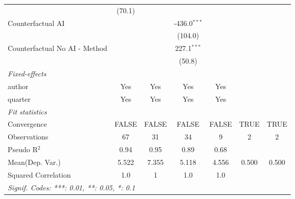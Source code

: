 \begin{tabular}{lcccccc}
                                                              & (70.1)       &                 &                &              &      &   \\   
   Counterfactual AI                                          &              &                 & -436.0$^{***}$ &              &      &   \\   
                                                              &              &                 & (104.0)        &              &      &   \\   
   Counterfactual No AI - Method                              &              &                 & 227.1$^{***}$  &              &      &   \\   
                                                              &              &                 & (50.8)         &              &      &   \\   
   \midrule
   \emph{Fixed-effects}\\
   author                                                     & Yes          & Yes             & Yes            & Yes          &      & \\  
   quarter                                                    & Yes          & Yes             & Yes            & Yes          &      & \\  
   \midrule
   \emph{Fit statistics}\\
   Convergence                                                &FALSE         & FALSE           & FALSE          & FALSE        & TRUE & TRUE\\  
   Observations                                               & 67           & 31              & 34             & 9            & 2    & 2\\  
   Pseudo R$^2$                                               & 0.94         & 0.95            & 0.89           & 0.68         &      & \\  
Mean(Dep. Var.) & 5.522 & 7.355 & 5.118 & 4.556 & 0.500 & 0.500 \\
   Squared Correlation                                        & 1.0          & 1               & 1.0            & 1.0          &      & \\  
   \midrule \midrule
   \multicolumn{7}{l}{\emph{Signif. Codes: ***: 0.01, **: 0.05, *: 0.1}}\\
\end{tabular}
\par\endgroup
